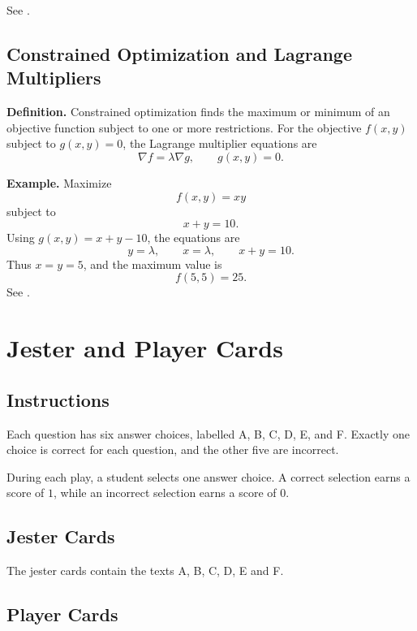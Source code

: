 \documentclass[a4paper,12pt]{article}
\theoremstyle{mystyle}
\numberwithin{equation}{section}
\numberwithin{theorem}{section}
\numberwithin{proposition}{section}
\numberwithin{example}{section}
\numberwithin{remark}{section}
\numberwithin{lemma}{section}
\numberwithin{corollary}{section}
\numberwithin{definition}{section}
\begin{document}
See \cite[Section~4.7]{openstax2016}.

\subsection{Constrained Optimization and Lagrange Multipliers}

\textbf{Definition.}
Constrained optimization finds the maximum or minimum of an objective
function subject to one or more restrictions. For the objective
$f(x,y)$ subject to $g(x,y)=0$, the Lagrange multiplier equations are
\[
    \nabla f=\lambda\nabla g,\qquad g(x,y)=0.
\]

\textbf{Example.}
Maximize
\[
    f(x,y)=xy
\]
subject to
\[
    x+y=10.
\]
Using $g(x,y)=x+y-10$, the equations are
\[
    y=\lambda,\qquad x=\lambda,\qquad x+y=10.
\]
Thus $x=y=5$, and the maximum value is
\[
    f(5,5)=25.
\]
See \cite[Section~4.8]{openstax2016}.


\section{Jester and Player Cards}
\label{S:3}
\subsection{Instructions}

Each question has six answer choices, labelled
A, B, C, D, E, and F. Exactly one choice is correct
for each question, and the other five are incorrect.

During each play, a student selects one answer choice.
A correct selection earns a score of $1$, while an
incorrect selection earns a score of $0$.


\subsection{Jester Cards}

The jester cards contain the texts A, B, C, D, E and F.

\subsection{Player Cards}
\end{document}
